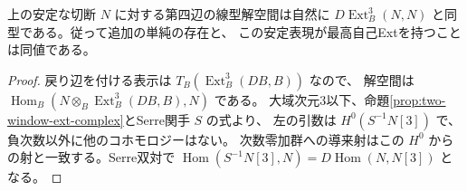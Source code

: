 \begin{corollary}\label{cor:two-dimensional-extension-space}
上の安定な切断 $N$ に対する第四辺の線型解空間は自然に
$D\operatorname{Ext}^3_B(N,N)$ と同型である。従って追加の単純の存在と、
この安定表現が最高自己Extを持つことは同値である。
\end{corollary}
\begin{proof}
戻り辺を付ける表示は $T_B(\operatorname{Ext}^3_B(DB,B))$ なので、
解空間は $\operatorname{Hom}_B(N\otimes_B \operatorname{Ext}^3_B(DB,B),N)$ である。
大域次元3以下、命題\ref{prop:two-window-ext-complex}とSerre関手 $S$ の式より、
左の引数は $H^0(S^{-1}N[3])$ で、負次数以外に他のコホモロジーはない。
次数零加群への導来射はこの $H^0$ からの射と一致する。Serre双対で
$\operatorname{Hom}(S^{-1}N[3],N)=D\operatorname{Hom}(N,N[3])$ となる。
\end{proof}
